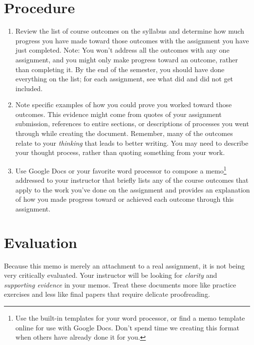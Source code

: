 \documentclass[11pt, oneside]{amsart}	%
\begin{document}
\section{Procedure} %
\label{sec:procedure}
\begin{enumerate}
	\item Review the list of course outcomes on the syllabus and determine how much progress you have made toward those outcomes with the assignment you have just completed. Note: You won't address all the outcomes with any one assignment, and you might only make progress toward an outcome, rather than completing it. By the end of the semester, you should have done everything on the list; for each assignment, see what did and did not get included.
	\item Note specific examples of how you could prove you worked toward those outcomes. This evidence might come from quotes of your assignment submission, references to entire sections, or descriptions of processes you went through while creating the document. Remember, many of the outcomes relate to your \emph{thinking} that leads to better writing. You may need to describe your thought process, rather than quoting something from your work.
	\item Use Google Docs or your favorite word processor to compose a memo\footnote{Use the built-in templates for your word processor, or find a memo template online for use with Google Docs. Don't spend time we creating this format when others have already done it for you.} addressed to your instructor that briefly lists any of the course outcomes that apply to the work you've done on the assignment and provides an explanation of how you made progress toward or achieved each outcome through this assignment.
\end{enumerate}




\section{Evaluation} %
\label{sec:evaluation}
Because this memo is merely an attachment to a real assignment, it is not being very critically evaluated. Your instructor will be looking for \emph{clarity} and \emph{supporting evidence} in your memos. Treat these documents more like practice exercises and less like final papers that require delicate proofreading.
\end{document}
